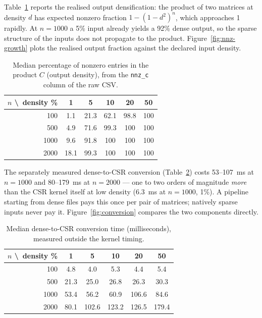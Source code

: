\documentclass[11pt,a4paper]{article}
\begin{document}
Table~\ref{tab:nnz} reports the realised output densification: the product
of two matrices at density $d$ has expected nonzero fraction
$1 - (1 - d^2)^n$, which approaches 1 rapidly. At $n = 1000$ a 5\% input
already yields a 92\% dense output, so the sparse structure of the inputs
does not propagate to the product. Figure~\ref{fig:nnz-growth} plots the
realised output fraction against the declared input density.

\begin{table}[htbp]
\centering
\caption{Median percentage of nonzero entries in the product $C$ (output
density), from the \texttt{nnz\_c} column of the raw CSV.}
\label{tab:nnz}
\begin{tabular}{rccccc}
\toprule
$n$ \textbackslash\ density \% & 1 & 5 & 10 & 20 & 50 \\
\midrule
100  & 1.1  & 21.3 & 62.1 & 98.8 & 100 \\
500  & 4.9  & 71.6 & 99.3 & 100  & 100 \\
1000 & 9.6  & 91.8 & 100  & 100  & 100 \\
2000 & 18.1 & 99.3 & 100  & 100  & 100 \\
\bottomrule
\end{tabular}
\end{table}

The separately measured dense-to-CSR conversion (Table~\ref{tab:conversion})
costs 53--107~ms at $n = 1000$ and 80--179~ms at $n = 2000$ --- one to two
orders of magnitude \emph{more} than the CSR kernel itself at low density
(6.3~ms at $n = 1000$, 1\%). A pipeline starting from dense files pays this
once per pair of matrices; natively sparse inputs never pay it.
Figure~\ref{fig:conversion} compares the two components directly.

\begin{table}[htbp]
\centering
\caption{Median dense-to-CSR conversion time (milliseconds), measured
outside the kernel timing.}
\label{tab:conversion}
\begin{tabular}{rccccc}
\toprule
$n$ \textbackslash\ density \% & 1 & 5 & 10 & 20 & 50 \\
\midrule
100  & 4.8  & 4.0  & 5.3  & 4.4  & 5.4 \\
500  & 21.3 & 25.0 & 26.8 & 26.3 & 30.3 \\
1000 & 53.4 & 56.2 & 60.9 & 106.6 & 84.6 \\
2000 & 80.1 & 102.6 & 123.2 & 126.5 & 179.4 \\
\bottomrule
\end{tabular}
\end{table}
\end{document}
